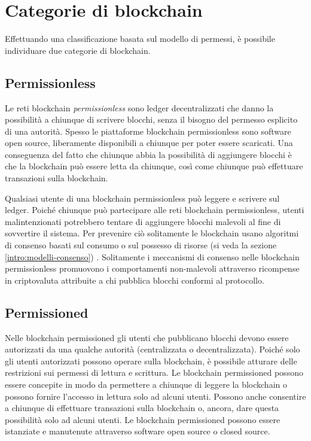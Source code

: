 \section{Categorie di blockchain}
Effettuando una classificazione basata sul modello di permessi,
è possibile individuare due categorie di blockchain.

\subsection{Permissionless}
\label{intro:permissionless}
Le reti blockchain \textit{permissionless} sono ledger decentralizzati che danno la possibilità
a chiunque di scrivere blocchi, senza il bisogno del permesso esplicito di una autorità.
Spesso le piattaforme blockchain permissionless sono software open source, liberamente
disponibili a chiunque per poter essere scaricati. Una conseguenza del fatto che
chiunque abbia la possibilità di aggiungere blocchi è che la blockchain può essere letta da chiunque,
così come chiunque può effettuare transazioni sulla blockchain.

Qualsiasi utente di una blockchain permissionless può leggere e scrivere sul ledger.
Poiché chiunque può partecipare alle reti blockchain permissionless, utenti malintenzionati
potrebbero tentare di aggiungere blocchi malevoli al fine di sovvertire il sistema.
Per prevenire ciò solitamente le blockchain usano algoritmi di consenso
basati sul consumo o sul possesso di risorse (si veda la sezione \ref{intro:modelli-consenso}) .
Solitamente i meccanismi di consenso nelle blockchain
permissionless promuovono i comportamenti non-malevoli attraverso ricompense in criptovaluta
attribuite a chi pubblica blocchi conformi al protocollo.

\subsection{Permissioned}
Nelle blockchain permissioned gli utenti che pubblicano blocchi devono essere autorizzati da una
qualche autorità (centralizzata o decentralizzata). Poiché solo gli utenti autorizzati possono operare
sulla blockchain, è possibile atturare delle restrizioni sui permessi di lettura e scrittura.
Le blockchain permissioned possono essere concepite in modo da permettere a chiunque di
leggere la blockchain o possono fornire l'accesso in lettura solo ad alcuni utenti.
Possono anche consentire a chiunque di effettuare transazioni sulla blockchain o, ancora,
dare questa possibilità solo ad alcuni utenti. Le blockchain permissioned possono essere
istanziate e manutenute attraverso software open source o closed source.

